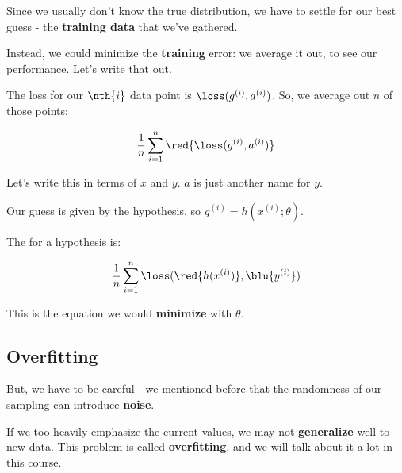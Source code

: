         Since we usually don't know the true distribution, we have to settle for our best guess - the \textbf{training data} that we've gathered. 
        
        Instead, we could minimize the \textbf{training} error: we average it out, to see our performance. Let's write that out.
        
        The loss for our $\nth{i}$ data point is $\loss(g^{(i)},a^{(i)})$. So, we average out $n$ of those points:
        
        \begin{equation}
            \frac{1}{n}  \sum_{i=1}^n \red{ \loss(  g^{(i)},  a^{(i)}  ) }
        \end{equation}
        
        Let's write this in terms of $x$ and $y$. $a$ is just another name for $y$. 
        
        Our guess is given by the hypothesis, so $g^{(i)} = h(x^{(i)};\theta)$.
        \\
        
        \begin{kequation}
            
            The  for a hypothesis is:
        
            \begin{equation*}
                \frac{1}{n}  \sum_{i=1}^n  \loss( \red{ h( x^{(i)} ) }, \blu{ y^{(i)} }  ) 
            \end{equation*}
        
        \end{kequation}
        
        
        This is the equation we would \textbf{minimize} with $\theta$.
        
        \subsection{Overfitting}
        
        But, we have to be careful - we mentioned before that the randomness of our sampling can introduce \textbf{noise}.
        
        If we too heavily emphasize the current values, we may not \textbf{generalize} well to new data. This problem is called \textbf{overfitting}, and we will talk about it a lot in this course.\\
        
